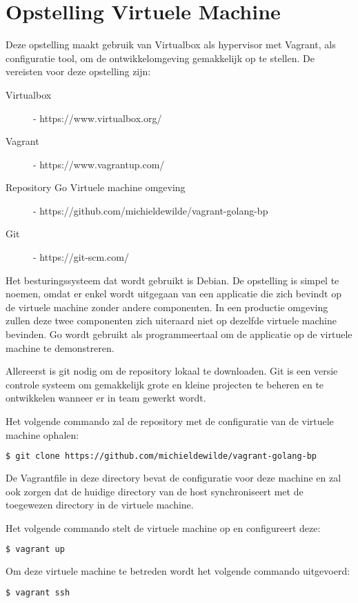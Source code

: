 \section{Opstelling Virtuele Machine}

Deze opstelling maakt gebruik van Virtualbox als hypervisor met Vagrant, als configuratie tool, om de ontwikkelomgeving gemakkelijk op te stellen. 
De vereisten voor deze opstelling zijn:
\begin{description}
\item [Virtualbox] - https://www.virtualbox.org/
\item [Vagrant] - https://www.vagrantup.com/
\item [Repository Go Virtuele machine omgeving] - https://github.com/michieldewilde/vagrant-golang-bp
\item [Git] - https://git-scm.com/
\end{description}

Het besturingssysteem dat wordt gebruikt is Debian. De opstelling is simpel te noemen, omdat er enkel wordt uitgegaan van een applicatie die zich bevindt op de virtuele machine zonder andere componenten. In een productie omgeving zullen deze twee componenten zich uiteraard niet op dezelfde virtuele machine bevinden. Go wordt gebruikt als programmeertaal om de applicatie op de virtuele machine te demonstreren.

Allereerst is git nodig om de repository lokaal te downloaden. Git is een versie controle systeem om gemakkelijk grote en kleine projecten te beheren en te ontwikkelen wanneer er in team gewerkt wordt.

\noindent Het volgende commando zal de repository met de configuratie van de virtuele machine ophalen:
\begin{lstlisting}[language=bash]
  $ git clone https://github.com/michieldewilde/vagrant-golang-bp
\end{lstlisting}

De Vagrantfile in deze directory bevat de configuratie voor deze machine en zal ook zorgen dat de huidige directory van de host synchroniseert met de toegewezen directory in de virtuele machine.

\noindent Het volgende commando stelt de virtuele machine op en configureert deze:
\begin{lstlisting}[language=bash]
  $ vagrant up
\end{lstlisting}

\noindent Om deze virtuele machine te betreden wordt het volgende commando uitgevoerd:
\begin{lstlisting}[language=bash]
  $ vagrant ssh
\end{lstlisting}

